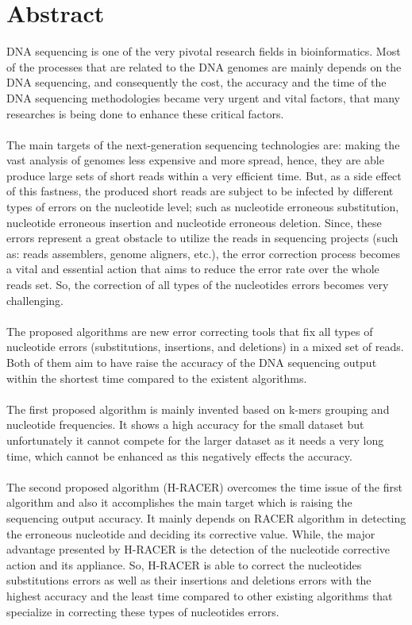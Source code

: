 \documentclass{llncs}
\begin{document}
\chapter*{Abstract}
DNA sequencing is one of the very pivotal research fields in bioinformatics. Most of the processes that are related to the DNA genomes are mainly depends on the DNA sequencing, and consequently the cost, the accuracy and the time of the DNA sequencing methodologies became very urgent and vital factors, that many researches is being done to enhance these critical factors.
\\
\\
The main targets of the next-generation sequencing technologies are: making the vast analysis of genomes less expensive and more spread, hence, they are able produce large sets of short reads within a very efficient time. But, as a side effect of this fastness, the produced short reads are subject to be infected by different types of errors on the nucleotide level; such as nucleotide erroneous substitution, nucleotide erroneous insertion and nucleotide erroneous deletion. Since, these errors represent a great obstacle to utilize the reads in sequencing projects (such as: reads assemblers, genome aligners, etc.), the error correction process becomes a vital and essential action that aims to reduce the error rate over the whole reads set. So, the correction of all types of the nucleotides errors becomes very challenging.
\\
\\ 
The proposed algorithms are new error correcting tools that fix all types of nucleotide errors (substitutions, insertions, and deletions) in a mixed set of reads. Both of them aim to have raise the accuracy of the DNA sequencing output within the shortest time compared to the existent algorithms. 
\\
\\
The first proposed algorithm is mainly invented based on k-mers grouping and nucleotide frequencies. It shows a high accuracy for the small dataset but unfortunately it cannot compete for the larger dataset as it needs a very long time, which cannot be enhanced as this negatively effects the accuracy.
\\
\\
The second proposed algorithm (H-RACER) overcomes the time issue of the first algorithm and also it accomplishes the main target which is raising the sequencing output accuracy. It mainly depends on RACER algorithm in detecting the erroneous nucleotide and deciding its corrective value. While, the major advantage presented by H-RACER is the detection of the nucleotide corrective action and its appliance. So, H-RACER is able to correct the nucleotides substitutions errors as well as their insertions and deletions errors with the highest accuracy and the least time compared to other existing algorithms that specialize in correcting these types of nucleotides errors.
\end{document}

